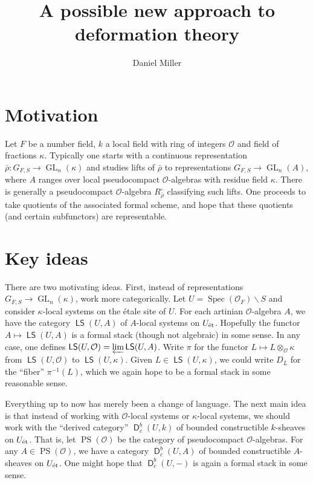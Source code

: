 \documentclass{amsart}
\title{A possible new approach to deformation theory}
\author{Daniel Miller}
\DeclareMathOperator{\derive}{\mathsf{D}}
\DeclareMathOperator{\GL}{GL}
\DeclareMathOperator{\localsystem}{\mathsf{LS}}
\DeclareMathOperator{\pseudocompact}{PS}
\DeclareMathOperator{\spec}{Spec}
\newcommand{\cO}{\mathcal{O}}
\newcommand{\etale}{\textnormal{\'et}}
\begin{document}
\maketitle





\section{Motivation}

Let $F$ be a number field, $k$ a local field with ring of integers $\cO$ and 
field of fractions $\kappa$. Typically one starts with a continuous 
representation $\bar\rho:G_{F,S} \to \GL_n(\kappa)$ and studies lifts of 
$\bar\rho$ to representations $G_{F,S} \to \GL_n(A)$, where $A$ ranges over 
local pseudocompact $\cO$-algebras with residue field $\kappa$. There is 
generally a pseudocompact $\cO$-algebra $R_{\bar\rho}^\square$ classifying 
such lifts. One proceeds to take quotients of the associated formal scheme, 
and hope that these quotients (and certain subfunctors) are representable. 





\section{Key ideas}

There are two motivating ideas. First, instead of representations 
$G_{F,S}\to \GL_n(\kappa)$, work more categorically. Let 
$U=\spec(\cO_F)\smallsetminus S$ and consider $\kappa$-local systems on 
the \'etale site of $U$. For each artinian $\cO$-algebra $A$, we have the 
category $\localsystem(U,A)$ of $A$-local systems on $U_\etale$. Hopefully 
the functor $A\mapsto\localsystem(U,A)$ is a formal stack (though not 
algebraic) in some sense. In any case, one defines 
$\localsystem(U,\cO) = \varprojlim \localsystem(U,A)$. Write 
$\pi$ for the functor $L\mapsto L\otimes_\cO \kappa$ from 
$\localsystem(U,\cO)$ to $\localsystem(U,\kappa)$. Given 
$L\in \localsystem(U,\kappa)$, we could write $D_L$ for the ``fiber'' 
$\pi^{-1}(L)$, which we again hope to be a formal stack in some reasonable 
sense. 

Everything up to now has merely been a change of language. The next main 
idea is that instead of working with $\cO$-local systems or 
$\kappa$-local systems, we should work with the ``derived category'' 
$\derive_c^b(U,k)$ of bounded constructible $k$-sheaves on 
$U_\etale$. That is, let $\pseudocompact(\cO)$ be the category of 
pseudocompact $\cO$-algebras. For any $A\in \pseudocompact(\cO)$, we have a 
category $\derive_c^b(U,A)$ of bounded constructible $A$-sheaves on $U_\etale$. 
One might hope that $\derive_c^b(U,-)$ is again a formal stack in some sense. 
\end{document}
